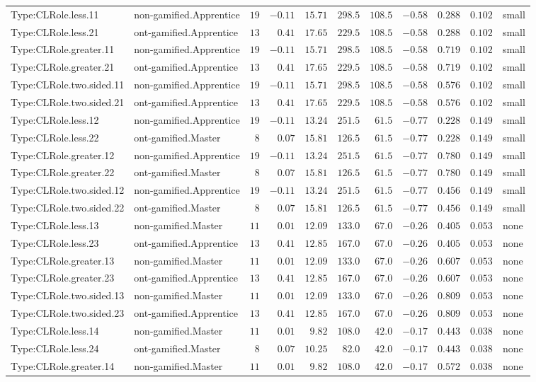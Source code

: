 \documentclass[6pt,a4paper]{article}
\begin{document}
{\begin{longtable}{llrrrrrrrrl}
Type:CLRole.less.11&non-gamified.Apprentice&$19$&$-0.11$&$15.71$&$298.5$&$108.5$&$-0.58$&$0.288$&$0.102$&small\tabularnewline
Type:CLRole.less.21&ont-gamified.Apprentice&$13$&$ 0.41$&$17.65$&$229.5$&$108.5$&$-0.58$&$0.288$&$0.102$&small\tabularnewline
Type:CLRole.greater.11&non-gamified.Apprentice&$19$&$-0.11$&$15.71$&$298.5$&$108.5$&$-0.58$&$0.719$&$0.102$&small\tabularnewline
Type:CLRole.greater.21&ont-gamified.Apprentice&$13$&$ 0.41$&$17.65$&$229.5$&$108.5$&$-0.58$&$0.719$&$0.102$&small\tabularnewline
Type:CLRole.two.sided.11&non-gamified.Apprentice&$19$&$-0.11$&$15.71$&$298.5$&$108.5$&$-0.58$&$0.576$&$0.102$&small\tabularnewline
Type:CLRole.two.sided.21&ont-gamified.Apprentice&$13$&$ 0.41$&$17.65$&$229.5$&$108.5$&$-0.58$&$0.576$&$0.102$&small\tabularnewline
Type:CLRole.less.12&non-gamified.Apprentice&$19$&$-0.11$&$13.24$&$251.5$&$ 61.5$&$-0.77$&$0.228$&$0.149$&small\tabularnewline
Type:CLRole.less.22&ont-gamified.Master&$ 8$&$ 0.07$&$15.81$&$126.5$&$ 61.5$&$-0.77$&$0.228$&$0.149$&small\tabularnewline
Type:CLRole.greater.12&non-gamified.Apprentice&$19$&$-0.11$&$13.24$&$251.5$&$ 61.5$&$-0.77$&$0.780$&$0.149$&small\tabularnewline
Type:CLRole.greater.22&ont-gamified.Master&$ 8$&$ 0.07$&$15.81$&$126.5$&$ 61.5$&$-0.77$&$0.780$&$0.149$&small\tabularnewline
Type:CLRole.two.sided.12&non-gamified.Apprentice&$19$&$-0.11$&$13.24$&$251.5$&$ 61.5$&$-0.77$&$0.456$&$0.149$&small\tabularnewline
Type:CLRole.two.sided.22&ont-gamified.Master&$ 8$&$ 0.07$&$15.81$&$126.5$&$ 61.5$&$-0.77$&$0.456$&$0.149$&small\tabularnewline
Type:CLRole.less.13&non-gamified.Master&$11$&$ 0.01$&$12.09$&$133.0$&$ 67.0$&$-0.26$&$0.405$&$0.053$&none\tabularnewline
Type:CLRole.less.23&ont-gamified.Apprentice&$13$&$ 0.41$&$12.85$&$167.0$&$ 67.0$&$-0.26$&$0.405$&$0.053$&none\tabularnewline
Type:CLRole.greater.13&non-gamified.Master&$11$&$ 0.01$&$12.09$&$133.0$&$ 67.0$&$-0.26$&$0.607$&$0.053$&none\tabularnewline
Type:CLRole.greater.23&ont-gamified.Apprentice&$13$&$ 0.41$&$12.85$&$167.0$&$ 67.0$&$-0.26$&$0.607$&$0.053$&none\tabularnewline
Type:CLRole.two.sided.13&non-gamified.Master&$11$&$ 0.01$&$12.09$&$133.0$&$ 67.0$&$-0.26$&$0.809$&$0.053$&none\tabularnewline
Type:CLRole.two.sided.23&ont-gamified.Apprentice&$13$&$ 0.41$&$12.85$&$167.0$&$ 67.0$&$-0.26$&$0.809$&$0.053$&none\tabularnewline
Type:CLRole.less.14&non-gamified.Master&$11$&$ 0.01$&$ 9.82$&$108.0$&$ 42.0$&$-0.17$&$0.443$&$0.038$&none\tabularnewline
Type:CLRole.less.24&ont-gamified.Master&$ 8$&$ 0.07$&$10.25$&$ 82.0$&$ 42.0$&$-0.17$&$0.443$&$0.038$&none\tabularnewline
Type:CLRole.greater.14&non-gamified.Master&$11$&$ 0.01$&$ 9.82$&$108.0$&$ 42.0$&$-0.17$&$0.572$&$0.038$&none\tabularnewline

\end{longtable}}
\end{document}
